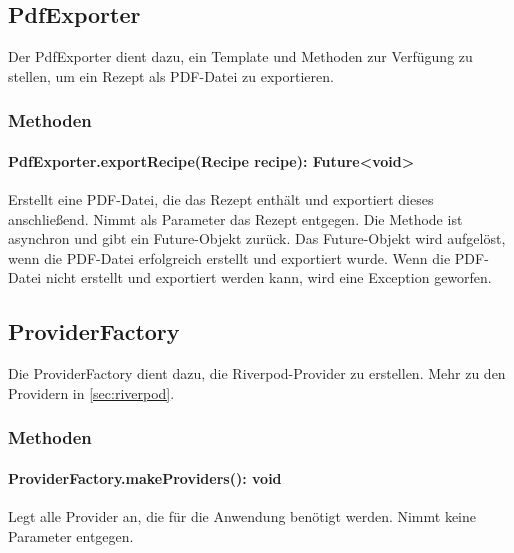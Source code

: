 \documentclass[parskip=full]{scrartcl}
\begin{document}
\subsection{PdfExporter}
Der PdfExporter dient dazu, ein Template und Methoden zur Verfügung zu stellen, um ein Rezept als PDF-Datei zu exportieren.
\subsubsection*{Methoden}
\paragraph{PdfExporter.exportRecipe(Recipe recipe): Future<void>}
Erstellt eine PDF-Datei, die das Rezept enthält und exportiert dieses anschließend. Nimmt als Parameter das Rezept entgegen. Die Methode ist asynchron und gibt ein Future-Objekt zurück. Das Future-Objekt wird aufgelöst, wenn die PDF-Datei erfolgreich erstellt und exportiert wurde. Wenn die PDF-Datei nicht erstellt und exportiert werden kann, wird eine Exception geworfen.
\newpage
\subsection{ProviderFactory}
Die ProviderFactory dient dazu, die Riverpod-Provider zu erstellen. Mehr zu den Providern in \ref{sec:riverpod}.
\subsubsection*{Methoden}
\paragraph{ProviderFactory.makeProviders(): void}
Legt alle Provider an, die für die Anwendung benötigt werden. Nimmt keine Parameter entgegen.
\newpage
\end{document}
